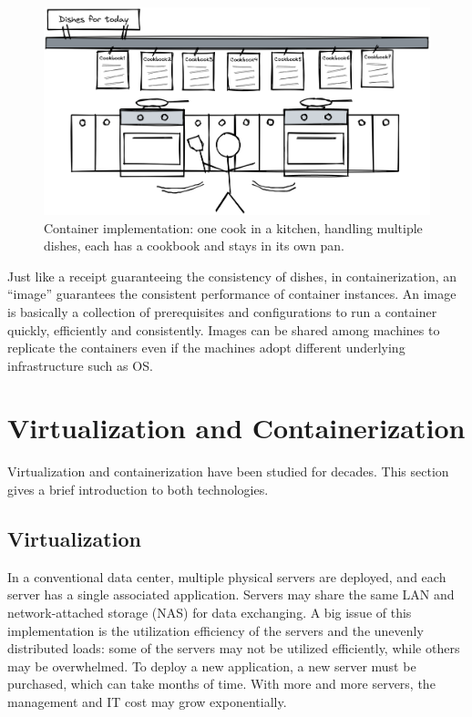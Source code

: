 \begin{figure}
	\centering
	\includegraphics[width=350pt]{chapters/ch-virtualization-and-containerization/figures/multitaskcook.png}
	\caption{Container implementation: one cook in a kitchen, handling multiple dishes, each has a cookbook and stays in its own pan.} \label{ch:vac:fig:multitaskcook}
\end{figure}

Just like a receipt guaranteeing the consistency of dishes, in containerization, an ``image'' guarantees the consistent performance of container instances. An image is basically a collection of prerequisites and configurations to run a container quickly, efficiently and consistently. Images can be shared among machines to replicate the containers even if the machines adopt different underlying infrastructure such as OS.

\section{Virtualization and Containerization}

Virtualization and containerization have been studied for decades. This section gives a brief introduction to both technologies.

\subsection{Virtualization}

In a conventional data center, multiple physical servers are deployed, and each server has a single associated application. Servers may share the same LAN and network-attached storage (NAS) for data exchanging. A big issue of this implementation is the utilization efficiency of the servers and the unevenly distributed loads: some of the servers may not be utilized efficiently, while others may be overwhelmed. To deploy a new application, a new server must be purchased, which can take months of time. With more and more servers, the management and IT cost may grow exponentially.

